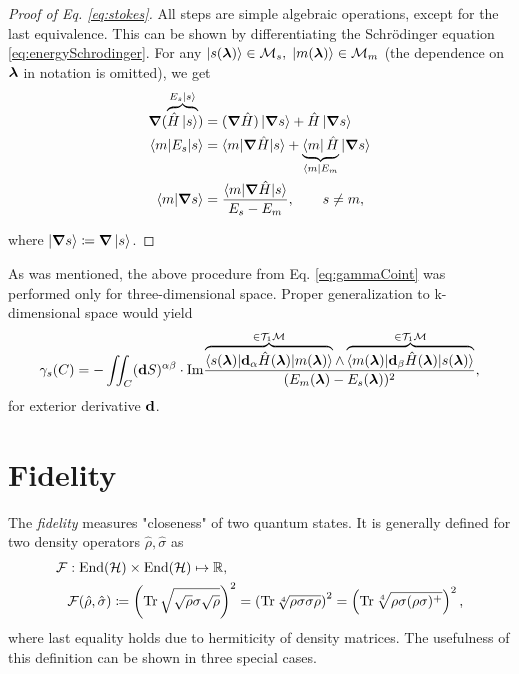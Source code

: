 \begin{proof}[Proof of Eq. \ref{eq:stokes}]
 All steps are simple algebraic operations, except for the last equivalence. This can be shown by differentiating the Schr\"odinger equation \ref{eq:energySchrodinger}. For any $\ket{s({\bm\lambda})}\in \mathcal{M}_s,\;\ket{m({\bm\lambda})}\in \mathcal{M}_m$ (the dependence on ${\bm\lambda}$ in notation is omitted), we get
\begin{equation}
    \begin{split}
        \bm \nabla (\overbrace{\hat{H}\ket{s}}^{E_s\ket{s}})&= (\bm\nabla \hat{H})\ket{\bm \nabla s} +\hat{H} \ket{\bm \nabla s}\\
        \braket{m|E_s|s}&= \braket{m|\bm \nabla \hat{H}| s}+ \underbrace{\bra{m} \hat{H}}_{\bra{m} E_m} |\bm\nabla s\rangle \\
        \braket{m|\bm \nabla s}&=
        \frac{\braket{m|\bm \nabla \hat{H} |s}}
        { E_s-E_m}, \qquad s\neq m,
    \end{split}
    \label{eq:mgradn_proof}
\end{equation}

where $\ket{\bm \nabla s}\coloneqq\bm \nabla \ket{ s}$.    
\end{proof} 

As was mentioned, the above procedure from Eq. \ref{eq:gammaCoint} was performed only for three-dimensional space. Proper generalization to k-dimensional space would yield
\begin{equation}
    \gamma_s(C) = -\iint_C (\bm{\mathrm{d}} S)^{\alpha\beta} \cdot\textrm{Im} \frac{
        \overbrace{\braket{s({\bm\lambda})|\bm{\mathrm{d}}_\alpha \hat{H}({\bm\lambda}) |m({\bm\lambda})}}^{\in\mathcal{T}_1\mathcal{M}}\wedge \overbrace{\braket{m({\bm\lambda})|\bm{\mathrm{d}}_\beta\hat{H}({\bm\lambda})|s({\bm\lambda})}}^{\in\mathcal{T}_1\mathcal{M}}    
    }{
        (E_m({\bm\lambda})-E_s({\bm\lambda}))^2
    },
    \label{eq:mgrads}
\end{equation}
for exterior derivative $\bm{\mathrm{d}}$.
                
                
                



\section{Fidelity}
The \emph{fidelity} measures "closeness" of two quantum states. It is generally defined for two density operators $\hat\rho, \hat\sigma$ as
\begin{equation}
    \begin{split}
        \mathcal F&: \operatorname{End}(\mathcal{H})\times \operatorname{End}(\mathcal{H})\mapsto \mathbb{R}, \\
        &\mathcal F(\hat\rho,\hat\sigma)\coloneqq \left(\operatorname{\textrm{Tr}} \sqrt{\sqrt{\rho}\sigma\sqrt{\rho}}\right)^2 = \left(\operatorname{\textrm{Tr}}\sqrt[4]{\rho \sigma \sigma \rho}\right)^2= \left(\operatorname{\textrm{Tr}}\sqrt[4]{\rho \sigma (\rho\sigma)^+ }\right)^2,
    \end{split}
    \label{eq:fidelitydef}
\end{equation}
where last equality holds due to hermiticity of density matrices.
The usefulness of this definition can be shown in three special cases.

